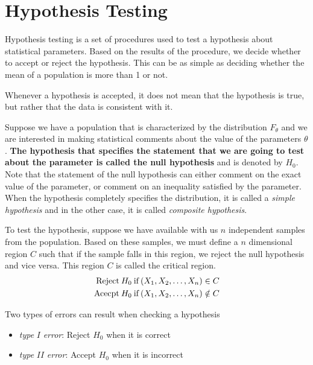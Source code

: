 \documentclass[../probability-notes.tex]{subfiles}
\begin{document}
    \section{Hypothesis Testing}
    Hypothesis testing is a set of procedures used to test a hypothesis about statistical parameters. Based on the results of the procedure, we decide whether to accept or reject the hypothesis. This can be as simple as deciding whether the mean of a population is more than 1 or not.\newline

    Whenever a hypothesis is accepted, it does not mean that the hypothesis is true, but rather that the data is consistent with it.\newline

    Suppose we have a population that is characterized by the distribution $F_{\theta}$ and we are interested in making statistical comments about the value of the parameters $\theta$. \textbf{The hypothesis that specifies the statement that we are going to test about the parameter is called the null hypothesis} and is denoted by $H_{0}$. Note that the statement of the null hypothesis can either comment on the exact value of the parameter, or comment on an inequality satisfied by the parameter. When the hypothesis completely specifies the distribution, it is called a \emph{simple hypothesis} and in the other case, it is called \emph{composite hypothesis}.\newline

    To test the hypothesis, suppose we have available with us $n$ independent samples from the population. Based on these samples, we must define a $n$ dimensional region $C$ such that if the sample falls in this region, we reject the null hypothesis and vice versa. This region $C$ is called the critical region.
    \begin{align*}
        \text{Reject\:} H_{0} \text{\:if\:} (X_{1}, X_{2}, \ldots, X_{n}) \in C\\
        \text{Acecpt\:} H_{0} \text{\:if\:} (X_{1}, X_{2}, \ldots, X_{n}) \notin C
    \end{align*}

    Two types of errors can result when checking a hypothesis
    \begin{itemize}
        \item \emph{type} $I$ \emph{error}: Reject $H_{0}$ when it is correct
        \item \emph{type} $II$ \emph{error}: Accept $H_{0}$ when it is incorrect
    \end{itemize}
\end{document}
